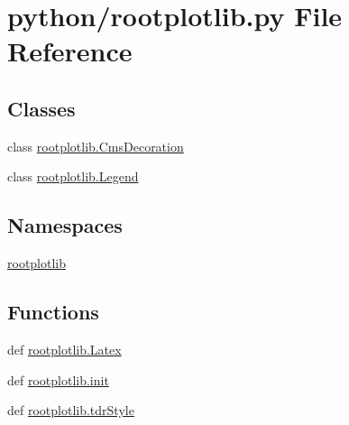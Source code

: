 \section{python/rootplotlib.py File Reference}
\label{rootplotlib_8py}
\subsection*{Classes}
\begin{DoxyCompactItemize}
\item 
class \hyperlink{classrootplotlib_1_1CmsDecoration}{rootplotlib.\-Cms\-Decoration}
\item 
class \hyperlink{classrootplotlib_1_1Legend}{rootplotlib.\-Legend}
\end{DoxyCompactItemize}
\subsection*{Namespaces}
\begin{DoxyCompactItemize}
\item 
\hyperlink{namespacerootplotlib}{rootplotlib}
\end{DoxyCompactItemize}
\subsection*{Functions}
\begin{DoxyCompactItemize}
\item 
def \hyperlink{namespacerootplotlib_a782500c9d655a2faa883fe3a3f8a469c}{rootplotlib.\-Latex}
\item 
def \hyperlink{namespacerootplotlib_ac9c9fd5886d49f4ad15eedaa8af18b10}{rootplotlib.\-init}
\item 
def \hyperlink{namespacerootplotlib_aaef7012494f2b1cfa4dad53b1733eb60}{rootplotlib.\-tdr\-Style}
\end{DoxyCompactItemize}
